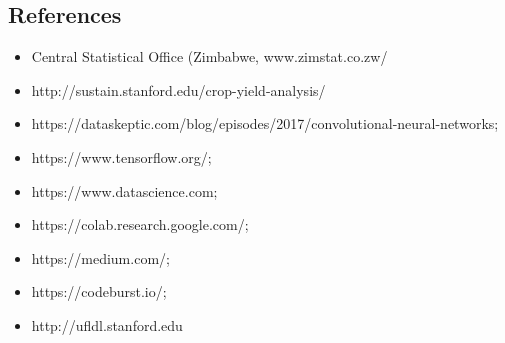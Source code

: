 \documentclass[11pt]{article}
\providecommand{\tightlist}{%
      \setlength{\itemsep}{0pt}\setlength{\parskip}{0pt}}
\begin{document}
    \subsection{References}\label{references}

\begin{itemize}
\tightlist
\item
  Central Statistical Office (Zimbabwe, www.zimstat.co.zw/
\item
  http://sustain.stanford.edu/crop-yield-analysis/
\item
  https://dataskeptic.com/blog/episodes/2017/convolutional-neural-networks;
\item
  https://www.tensorflow.org/;
\item
  https://www.datascience.com;
\item
  https://colab.research.google.com/;
\item
  https://medium.com/;
\item
  https://codeburst.io/;
\item
  http://ufldl.stanford.edu
\end{itemize}


    
    
    
    
\end{document}
